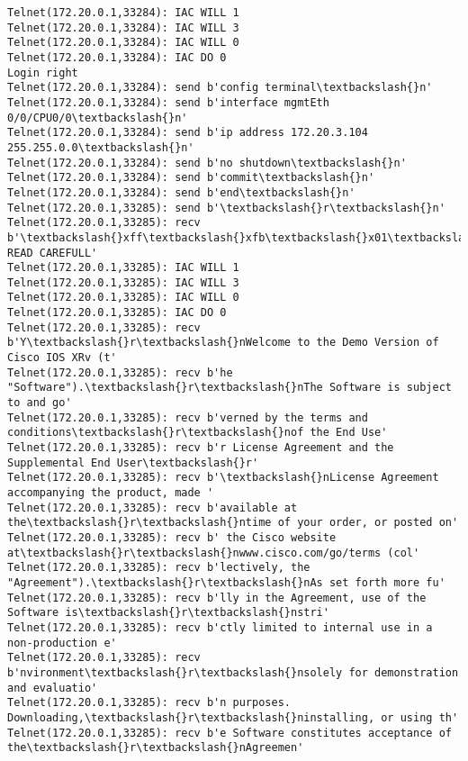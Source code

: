 \documentclass[11pt]{article}
\begin{document}
\begin{Verbatim}[commandchars=\\\{\}]
Telnet(172.20.0.1,33284): IAC WILL 1
Telnet(172.20.0.1,33284): IAC WILL 3
Telnet(172.20.0.1,33284): IAC WILL 0
Telnet(172.20.0.1,33284): IAC DO 0
Login right
Telnet(172.20.0.1,33284): send b'config terminal\textbackslash{}n'
Telnet(172.20.0.1,33284): send b'interface mgmtEth 0/0/CPU0/0\textbackslash{}n'
Telnet(172.20.0.1,33284): send b'ip address 172.20.3.104 255.255.0.0\textbackslash{}n'
Telnet(172.20.0.1,33284): send b'no shutdown\textbackslash{}n'
Telnet(172.20.0.1,33284): send b'commit\textbackslash{}n'
Telnet(172.20.0.1,33284): send b'end\textbackslash{}n'
Telnet(172.20.0.1,33285): send b'\textbackslash{}r\textbackslash{}n'
Telnet(172.20.0.1,33285): recv b'\textbackslash{}xff\textbackslash{}xfb\textbackslash{}x01\textbackslash{}xff\textbackslash{}xfb\textbackslash{}x03\textbackslash{}xff\textbackslash{}xfb\textbackslash{}x00\textbackslash{}xff\textbackslash{}xfd\textbackslash{}x00\textbackslash{}x1b]0;xrv5\textbackslash{}x07\textbackslash{}r\textbackslash{}n\textbackslash{}r\textbackslash{}nIMPORTANT:  READ CAREFULL'
Telnet(172.20.0.1,33285): IAC WILL 1
Telnet(172.20.0.1,33285): IAC WILL 3
Telnet(172.20.0.1,33285): IAC WILL 0
Telnet(172.20.0.1,33285): IAC DO 0
Telnet(172.20.0.1,33285): recv b'Y\textbackslash{}r\textbackslash{}nWelcome to the Demo Version of Cisco IOS XRv (t'
Telnet(172.20.0.1,33285): recv b'he "Software").\textbackslash{}r\textbackslash{}nThe Software is subject to and go'
Telnet(172.20.0.1,33285): recv b'verned by the terms and conditions\textbackslash{}r\textbackslash{}nof the End Use'
Telnet(172.20.0.1,33285): recv b'r License Agreement and the Supplemental End User\textbackslash{}r'
Telnet(172.20.0.1,33285): recv b'\textbackslash{}nLicense Agreement accompanying the product, made '
Telnet(172.20.0.1,33285): recv b'available at the\textbackslash{}r\textbackslash{}ntime of your order, or posted on'
Telnet(172.20.0.1,33285): recv b' the Cisco website at\textbackslash{}r\textbackslash{}nwww.cisco.com/go/terms (col'
Telnet(172.20.0.1,33285): recv b'lectively, the "Agreement").\textbackslash{}r\textbackslash{}nAs set forth more fu'
Telnet(172.20.0.1,33285): recv b'lly in the Agreement, use of the Software is\textbackslash{}r\textbackslash{}nstri'
Telnet(172.20.0.1,33285): recv b'ctly limited to internal use in a non-production e'
Telnet(172.20.0.1,33285): recv b'nvironment\textbackslash{}r\textbackslash{}nsolely for demonstration and evaluatio'
Telnet(172.20.0.1,33285): recv b'n purposes.  Downloading,\textbackslash{}r\textbackslash{}ninstalling, or using th'
Telnet(172.20.0.1,33285): recv b'e Software constitutes acceptance of the\textbackslash{}r\textbackslash{}nAgreemen'

\end{Verbatim}
\end{document}
